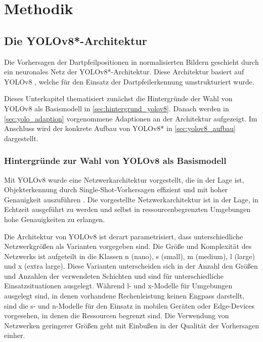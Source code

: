 
\section{Methodik}
\label{sec:ki:methodik}



\subsection{Die YOLOv8*-Architektur}
\label{sec:warum_yolov8}

Die Vorhersagen der Dartpfeilpositionen in normalisierten Bildern geschieht durch ein neuronales Netz der YOLOv8*-Architektur. Diese Architektur basiert auf YOLOv8 \cite{yolov8_paper}, welche für den Einsatz der Dartpfeilerkennung umstrukturiert wurde.

Dieses Unterkapitel thematisiert zunächst die Hintergründe der Wahl von YOLOv8 als Basismodell in \autoref{sec:hintergrund_yolov8}. Danach werden in \autoref{sec:yolo_adaption} vorgenommene Adaptionen an der Architektur aufgezeigt. Im Anschluss wird der konkrete Aufbau von YOLOv8* in \autoref{sec:yolov8_aufbau} dargestellt.

\subsubsection{Hintergründe zur Wahl von YOLOv8 als Basismodell}
\label{sec:hintergrund_yolov8}

Mit YOLOv8 wurde eine Netzwerkarchitektur vorgestellt, die in der Lage ist, Objekterkennung durch Single-Shot-Vorhersagen effizient und mit hoher Genauigkeit auszuführen \cite{yolov8_paper}. Die vorgestellte Netzwerkarchitektur ist in der Lage, in Echtzeit ausgeführt zu werden und selbst in ressourcenbegrenzten Umgebungen hohe Genauigkeiten zu erlangen.

Die Architektur von YOLOv8 ist derart parametrisiert, dass unterschiedliche Netzwerkgrößen als Varianten vorgegeben sind. Die Größe und Komplexität des Netzwerks ist aufgeteilt in die Klassen n (nano), s (small), m (medium), l (large) und x (extra large). Diese Varianten unterscheiden sich in der Anzahl den Größen und Anzahlen der verwendeten Schichten und sind für unterschiedliche Einsatzsituationen ausgelegt. Während l- und x-Modelle für Umgebungen ausgelegt sind, in denen vorhandene Rechenleistung keinen Engpass darstellt, sind die s- und n-Modelle für den Einsatz in mobilen Geräten oder Edge-Devices vorgesehen, in denen die Ressourcen begrenzt sind. Die Verwendung von Netzwerken geringerer Größen geht mit Einbußen in der Qualität der Vorhersagen einher.

